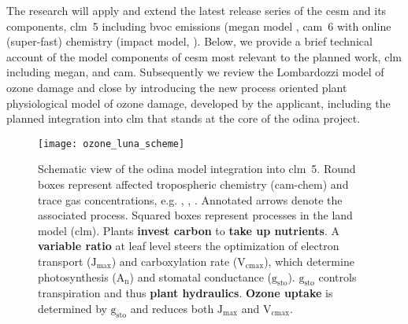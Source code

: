 The research will apply and extend the latest release series of the \gls{cesm} and its components, \gls{clm}~5 including \gls{bvoc} emissions (\gls{megan} model \parencite{ACP:Guenther2006}, \gls{cam}~6 with online (super-fast) chemistry (\gls{impact} model, \parencite{JGR:Rotman2004}). Below, we provide a brief technical account of the model components of \gls{cesm} most relevant to the planned work, \gls{clm} including \gls{megan}, and \gls{cam}. Subsequently we review the Lombardozzi model of ozone damage and close by introducing the new process oriented plant physiological model of ozone damage, developed by the applicant, including the planned integration into \gls{clm} that stands at the core of the \gls{odina} project.

\begin{figure}[!bh]
  \centering
  \texttt{[image: ozone\_luna\_scheme]} %
  \caption{Schematic view of the \gls{odina} model integration into \gls{clm}~5. Round boxes represent affected tropospheric chemistry (\gls{cam}-chem) and trace gas concentrations, e.g. \ch{[CO_2]}, \ch{[O_3]}, \ch{[H_2O]}. Annotated arrows denote the associated process. Squared boxes represent processes in the land model (\gls{clm}). Plants \textbf{\color{darkgray}invest carbon} to \textbf{\color{darkgray}take up nutrients}. A \textbf{\color{OliveGreen}variable  ratio} at leaf level steers the optimization of electron transport ($\mathrm{J_{max}}$) and carboxylation rate ($\mathrm{V_{cmax}}$), which determine photosynthesis ($\mathrm{A_n}$) and stomatal conductance ($\mathrm{g_{sto}}$). $\mathrm{g_{sto}}$ controls transpiration and thus \textbf{\color{blue}plant hydraulics}. \textbf{\color{red}Ozone uptake} is determined by $\mathrm{g_{sto}}$ and reduces both $\mathrm{J_{max}}$ and $\mathrm{V_{cmax}}$.
}
  \label{fig:ozone_odina}
\end{figure}

